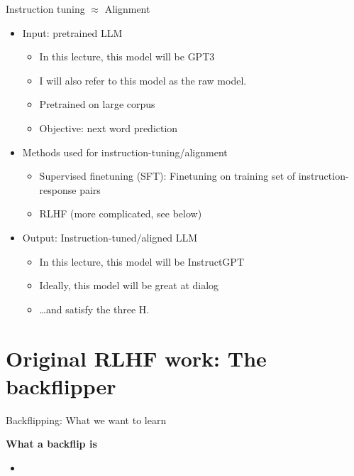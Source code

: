 \documentclass[11pt,compress,t,notes=noshow, xcolor=table]{beamer}
\def\myblue#1{\textcolor{texblue}{#1}}
\begin{document}
\begin{vbframe}{Instruction tuning $\approx$ Alignment}



\vfill

\begin{itemize}
	\item Input: pretrained LLM
\begin{itemize}
\item In this lecture, this model will be \myblue{GPT3}
\item I will also refer to this model as the \myblue{raw model}.
\item
        Pretrained on large
        corpus
        \item Objective: next word prediction
        \end{itemize}
        \item Methods used for instruction-tuning/alignment
\begin{itemize}
\item
Supervised finetuning (SFT): Finetuning on training set of
        instruction-response pairs
        \item RLHF (more complicated, see below)
        \end{itemize}
        \item Output: Instruction-tuned/aligned LLM
\begin{itemize}
\item In this lecture, this model will be \myblue{InstructGPT}
\item Ideally, this model will be great at dialog
\item \ldots and
        satisfy the three H.
        
\end{itemize}
\end{itemize}


\vfill

\end{vbframe}





\section{Original RLHF work: The backflipper}


\begin{vbframe}{Backflipping: What we want to learn}

\vfill

\textbf{What a backflip is}

	\begin{itemize}
		\item \href{https://d2gk6qz8djobw9.cloudfront.net/artwork/595/browse1497710839.gif}{}

	\end{itemize}

\vfill

\end{vbframe}
\end{document}
